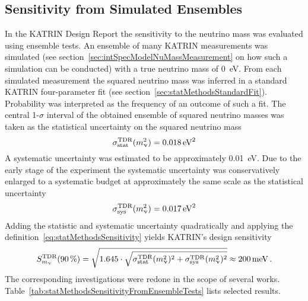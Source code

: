 \subsection{Sensitivity from Simulated Ensembles}
\label{sec:statMethodsSensitivtyFromEnsemble}
In the KATRIN Design Report the sensitivity to the neutrino mass was evaluated using ensemble tests. An ensemble of many KATRIN measurements was simulated (see section~\ref{sec:intSpecModelNuMassMeasurement} on how such a simulation can be conducted) with a true neutrino mass of \SI{0}{eV}. From each simulated measurement the squared neutrino mass was inferred in a standard KATRIN four-parameter fit (see section~\ref{sec:statMethodsStandardFit}). Probability was interpreted as the frequency of an outcome of such a fit. The central 1-$\sigma$ interval of the obtained ensemble of squared neutrino masses was taken as the statistical uncertainty on the squared neutrino mass~\cite{Angrik:2005ep}
\begin{equation}
	\sigma_\mathrm{stat}^\mathrm{TDR}(m_\upnu^2) = \SI{0.018}{eV^2}
\end{equation}
A systematic uncertainty was estimated to be approximately \SI{0.01}{eV}. Due to the early stage of the experiment the systematic uncertainty was conservatively enlarged to a systematic budget at approximately the same scale as the statistical uncertainty~\cite{Angrik:2005ep}
\begin{equation}
	\sigma_\mathrm{sys}^\mathrm{TDR}(m_\upnu^2) = \SI{0.017}{eV^2}
\end{equation}
Adding the statistic and systematic uncertainty quadratically and applying the definition~\eqref{eq:statMethodsSensitivity} yields KATRIN's design sensitivity~\cite{Angrik:2005ep}
\begin{equation}
	\label{eq:statMethodsSensitivityDesignReport}
	S_{m_\upnu}^{\mathrm{TDR}}(\SI{90}{\percent}) = 
	\sqrt{1.645\cdot
		\sqrt{
		\sigma_\mathrm{stat}^\mathrm{TDR}(m_\upnu^2)^2+\sigma_\mathrm{sys}^\mathrm{TDR}(m_\upnu^2)^2
	}}
	\approx \SI{200}{meV}
	\text{\,.}
\end{equation}
The corresponding investigations were redone in the scope of several works. Table~\ref{tab:statMethodsSensitivityFromEnsembleTests} lists selected results.
